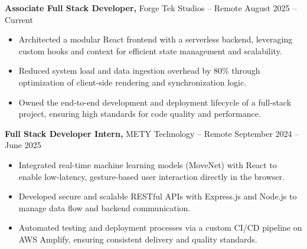 \documentclass[11pt]{article}       %
\begin{document}
\textbf{Associate Full Stack Developer,} {Forge Tek Studios} -- Remote \hfill August 2025 -- Current 
\vspace{-9pt}
\begin{itemize}
  \item Architected a modular React frontend with a serverless backend, leveraging custom hooks and context for efficient state management and scalability.
  \item Reduced system load and data ingestion overhead by 80\% through optimization of client-side rendering and synchronization logic.
  \item Owned the end-to-end development and deployment lifecycle of a full-stack project, ensuring high standards for code quality and performance.
\end{itemize}

\textbf{Full Stack Developer Intern,} {METY Technology} -- Remote \hfill September 2024 -- June 2025 
\vspace{-9pt}
\begin{itemize}
  \item Integrated real-time machine learning models (MoveNet) with React to enable low-latency, gesture-based user interaction directly in the browser.
  \item Developed secure and scalable RESTful APIs with Express.js and Node.js to manage data flow and backend communication.
  \item Automated testing and deployment processes via a custom CI/CD pipeline on AWS Amplify, ensuring consistent delivery and quality standards.
\end{itemize}
\end{document}
